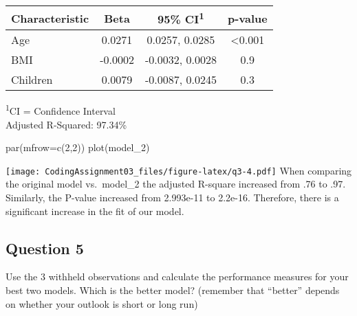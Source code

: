 \documentclass[
]{article}
\newenvironment{Shaded}{\begin{snugshade}}{\end{snugshade}}
\newcommand{\AttributeTok}[1]{\textcolor[rgb]{0.77,0.63,0.00}{#1}}
\newcommand{\DecValTok}[1]{\textcolor[rgb]{0.00,0.00,0.81}{#1}}
\newcommand{\FunctionTok}[1]{\textcolor[rgb]{0.00,0.00,0.00}{#1}}
\newcommand{\NormalTok}[1]{#1}
\begin{document}
\setlength{\LTpost}{0mm}
\begin{longtable}{lccc}
\toprule
\textbf{Characteristic} & \textbf{Beta} & \textbf{95\% CI}\textsuperscript{1} & \textbf{p-value} \\ 
\midrule
Age & 0.0271 & 0.0257, 0.0285 & <0.001 \\ 
BMI & -0.0002 & -0.0032, 0.0028 & 0.9 \\ 
Children & 0.0079 & -0.0087, 0.0245 & 0.3 \\ 
\bottomrule
\end{longtable}
\begin{minipage}{\linewidth}
\textsuperscript{1}CI = Confidence Interval\\
Adjusted R-Squared: 97.34\%\\
\end{minipage}

\begin{Shaded}
\begin{Highlighting}[]
\FunctionTok{par}\NormalTok{(}\AttributeTok{mfrow=}\FunctionTok{c}\NormalTok{(}\DecValTok{2}\NormalTok{,}\DecValTok{2}\NormalTok{))}
\FunctionTok{plot}\NormalTok{(model\_2)}
\end{Highlighting}
\end{Shaded}

\texttt{[image: CodingAssignment03\_files/figure-latex/q3-4.pdf]} When
comparing the original model vs.~model\_2 the adjusted R-square
increased from .76 to .97. Similarly, the P-value increased from
2.993e-11 to 2.2e-16. Therefore, there is a significant increase in the
fit of our model.

\hypertarget{question-5}{%
\subsection{Question 5}\label{question-5}}

Use the 3 withheld observations and calculate the performance measures
for your best two models. Which is the better model? (remember that
``better'' depends on whether your outlook is short or long run)
\end{document}
